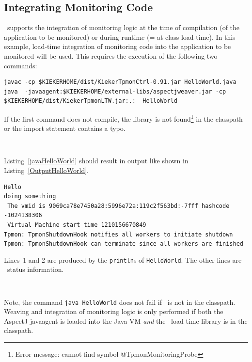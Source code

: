\documentclass[a4paper,12pt]{scrartcl}
\begin{document}
\subsection{Integrating Monitoring Code}
\tpmon\ supports the integration of monitoring logic at the time of compilation (of the application to be monitored) or during runtime (= at class load-time). In this example, load-time integration of monitoring code into the application to be monitored will be used. This requires the execution of the following two commands:

\begin{lstlisting}[caption={Compilation and execution with AspectJ's Java agent.},label={javaHelloWorld}]
javac -cp $KIEKERHOME/dist/KiekerTpmonCtrl-0.91.jar HelloWorld.java
java  -javaagent:$KIEKERHOME/external-libs/aspectjweaver.jar -cp $KIEKERHOME/dist/KiekerTpmonLTW.jar:.:  HelloWorld
\end{lstlisting}
If the first command does not compile, the \tpmon{} library is not found\footnote{Error message: cannot find symbol @TpmonMonitoringProbe} in the classpath or the import statement contains a typo.

\

Listing~\ref{javaHelloWorld} should result in output like shown in Listing~\ref{OutputHelloWorld}.
\begin{lstlisting}[caption={Compilation and execution with AspectJ's Java agent.},label={OutputHelloWorld}]
Hello
doing something
 The vmid is 9069ca78e7450a28:5996e72a:119c2f563bd:-7fff hashcode -1024138306
 Virtual Machine start time 1210156670849
Tpmon: TpmonShutdownHook notifies all workers to initiate shutdown
Tpmon: TpmonShutdownHook can terminate since all workers are finished
\end{lstlisting}
Lines~1 and 2 are produced by the \texttt{println}s of \texttt{HelloWorld}. The other lines are \tpmon\ status information.

\

Note, the command \texttt{java  HelloWorld} does not fail if  \tpmon\ is not in the classpath. Weaving and integration of monitoring logic is only performed if both the AspectJ javaagent is loaded into the Java VM \textit{and} the \tpmon\ load-time library is in the classpath.
\end{document}
